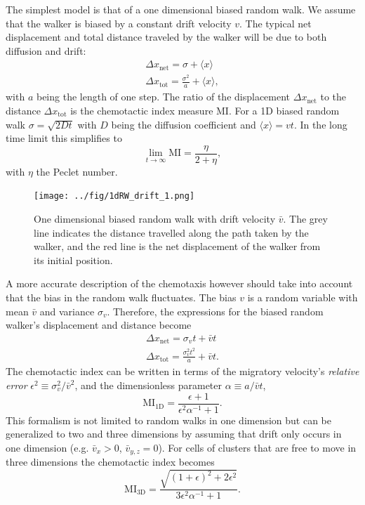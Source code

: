 The simplest model is that of a one dimensional biased random walk. We assume that the walker is biased by a constant drift velocity $v$. The typical net displacement and total distance traveled by the walker will be due to both diffusion and drift:
\begin{gather}
    \Delta x_\text{net} = \sigma + \langle x \rangle \\
    \Delta x_\text{tot} = \frac{\sigma^2}{a} + \langle x \rangle ,
\end{gather}
with $a$ being the length of one step. The ratio of the displacement $\Delta x_\text{net}$ to the distance $\Delta x_\text{tot}$ is the chemotactic index measure MI. For a 1D biased random walk $\sigma = \sqrt{2Dt}$ with $D$ being the diffusion coefficient and $\langle x \rangle = vt$. In the long time limit this simplifies to
\begin{equation}
    \lim_{t\to\infty} \text{MI} = \frac{\eta}{2+\eta} ,
\end{equation}
with $\eta$ the Peclet number.

\begin{figure}
    \centering
        \texttt{[image: ../fig/1dRW\_drift\_1.png]}
    \caption{One dimensional biased random walk with drift velocity $\bar{v}$. The grey line indicates the distance travelled along the path taken by the walker, and the red line is the net displacement of the walker from its initial position.} \label{fig:rw}
\end{figure}

A more accurate description of the chemotaxis however should take into account that the bias in the random walk fluctuates. The bias $v$ is a random variable with mean $\bar{v}$ and variance $\sigma_v$. Therefore, the expressions for the biased random walker's displacement and distance become
\begin{gather}
    \Delta x_\text{net} = \sigma_v t + \bar{v}t \\
    \Delta x_\text{tot} = \frac{\sigma^2_v t^2}{a} + \bar{v} t.
\end{gather}
The chemotactic index can be written in terms of the migratory velocity's \textit{relative error}
$\epsilon^2 \equiv \sigma_v^2 / \bar{v}^2$,
and the dimensionless parameter
$\alpha \equiv a / \bar{v} t$,
\begin{equation}
    \text{MI}_{1\text{D}} = \frac{\epsilon + 1}{\epsilon^2\alpha^{-1}+1} .
\end{equation}
This formalism is not limited to random walks in one dimension but can be generalized to two and three dimensions by assuming that drift only occurs in one dimension (e.g.
$\bar{v}_x>0$, $\bar{v}_{y,z}=0$).
For cells of clusters that are free to move in three dimensions the chemotactic index becomes
\begin{equation} \label{eq:mi3d}
    \text{MI}_{3\text{D}} = \frac{\sqrt{(1+\epsilon)^2 + 2\epsilon^2}}
                            {3\epsilon^2\alpha^{-1}+1} .
\end{equation}

